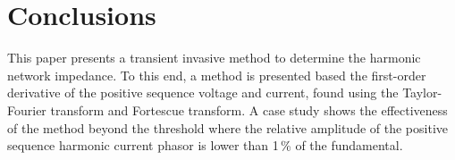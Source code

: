 \section{Conclusions}
\label{sec:conclusions}

This paper presents a transient invasive method to determine the harmonic network impedance. To this end, a method is presented based the first-order derivative of the positive sequence voltage and current, found using the Taylor-Fourier transform and Fortescue transform. A case study shows the effectiveness of the method beyond the threshold where the relative amplitude of the positive sequence harmonic current phasor is lower than 1\,\% of the fundamental.